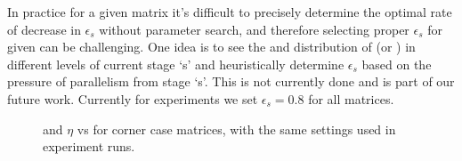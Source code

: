 In practice for a given matrix it's difficult to precisely determine the optimal rate of decrease in $\epsilon_s$ without parameter search, and therefore selecting proper $\epsilon_s$ for given \nthreads can be challenging. One idea is to see the \totalLvl and distribution of \nrows (or \nnz) in different levels of current stage `s' and heuristically determine $\epsilon_s$ based on the pressure of parallelism from stage `s'. This is not currently done and is part of our future work. Currently for experiments we set $\epsilon_s=0.8$ for all matrices.

\begin{figure}[tbhp]
	\centering
	\hspace{1.5em}
	\hspace{1.5em}
	\hspace{1.5em}
	\caption{\threadEff and $\eta$ vs \nthreads for corner case matrices, with the same settings used in experiment runs.}
	\label{fig:corner_cases_param}
\end{figure}

